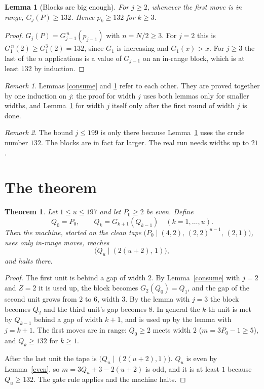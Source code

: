 \documentclass[11pt]{article}
\newtheorem{theorem}{Theorem}
\newtheorem{lemma}{Lemma}
\theoremstyle{definition}
\theoremstyle{remark}
\newtheorem{remark}{Remark}
\newcommand{\st}[2]{\bigl(#1 \mid #2\bigr)}
\begin{document}
\begin{lemma}[Blocks are big enough]\label{big}
For $j\ge 2$, whenever the first move is in range, $G_j(P)\ge 132$.
Hence $p_k\ge 132$ for $k\ge 3$.
\end{lemma}
\begin{proof}
$G_j(P)=G_{j-1}^{\,n}(p_{j-1})$ with $n=N/2\ge 3$. For $j=2$ this is
$G_1^{\,n}(2)\ge G_1^{3}(2)=132$, since $G_1$ is increasing and $G_1(x)>x$.
For $j\ge 3$ the last of the $n$ applications is a value of $G_{j-1}$ on an
in-range block, which is at least $132$ by induction.
\end{proof}

\begin{remark}
Lemmas \ref{consume} and \ref{big} refer to each other. They are proved together
by one induction on $j$: the proof for width $j$ uses both lemmas only for
smaller widths, and Lemma~\ref{big} for width $j$ itself only after the first
round of width $j$ is done.
\end{remark}

\begin{remark}
The bound $j\le 199$ is only there because Lemma~\ref{big} uses the crude number
$132$. The blocks are in fact far larger. The real run needs widths up to $21$.
\end{remark}

\section{The theorem}

\begin{theorem}\label{main}
Let $1\le u\le 197$ and let $P_0\ge 2$ be even. Define
\[
Q_0=P_0,\qquad Q_k=G_{k+1}(Q_{k-1})\quad(k=1,\dots,u).
\]
Then the machine, started on the clean tape
$\st{P_0}{(4,2),\,(2,2)^{u-1},\,(2,1)}$, uses only in-range moves, reaches
\[
\st{Q_u}{(2(u+2),\,1)},
\]
and halts there.
\end{theorem}
\begin{proof}
The first unit is behind a gap of width $2$. By Lemma~\ref{consume} with $j=2$
and $Z=2$ it is used up, the block becomes $G_2(Q_0)=Q_1$, and the gap of the
second unit grows from $2$ to $6$, width $3$. By the lemma with $j=3$ the block
becomes $Q_2$ and the third unit's gap becomes $8$. In general the $k$-th unit
is met by $Q_{k-1}$ behind a gap of width $k+1$, and is used up by the lemma
with $j=k+1$. The first moves are in range: $Q_0\ge 2$ meets width $2$
($m=3P_0-1\ge 5$), and $Q_k\ge 132$ for $k\ge 1$.

After the last unit the tape is $\st{Q_u}{(2(u+2),1)}$. $Q_u$ is even by
Lemma~\ref{even}, so $m=3Q_u+3-2(u+2)$ is odd, and it is at least $1$ because
$Q_u\ge 132$. The gate rule applies and the machine halts.
\end{proof}
\end{document}
